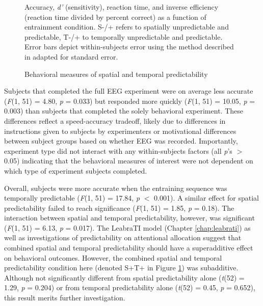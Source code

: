 \documentclass[dwyatte_dissertation.tex]{subfiles}
\begin{document}
\begin{figure}[h!]
\begin{center}
\begin{tabular}{ll}
\end{tabular}
\end{center}
\caption{Behavioral measures of spatial and temporal predictability}{Accuracy, \textit{d'} (sensitivity), reaction time, and inverse efficiency (reaction time divided by percent correct) as a function of entrainment condition. S-/+ refers to spatially unpredictable and predictable, T-/+ to temporally unpredictable and predictable. Error bars depict within-subjects error using the method described in \protect{} adapted for standard error.}
\label{fig:pleast_behave}
\end{figure}

Subjects that completed the full EEG experiment were on average less accurate (\textit{F}(1, 51) = 4.80, \textit{p} = 0.033) but responded more quickly (\textit{F}(1, 51) = 10.05, \textit{p} = 0.003) than subjects that completed the solely behavioral experiment. These differences reflect a speed-accuracy tradeoff, likely due to differences in instructions given to subjects by experimenters or motivational differences between subject groups based on whether EEG was recorded. Importantly, experiment type did not interact with any within-subjects factors (all \textit{p}'s $>$ 0.05) indicating that the behavioral measures of interest were not dependent on which type of experiment subjects completed.

Overall, subjects were more accurate when the entraining sequence was temporally predictable (\textit{F}(1, 51) = 17.84, \textit{p} $<$ 0.001). A similar effect for spatial predictability failed to reach significance (\textit{F}(1, 51) = 1.85, \textit{p} = 0.18). The interaction between spatial and temporal predictability, however, was significant (\textit{F}(1, 51) = 6.13, \textit{p} = 0.017). The LeabraTI model (Chapter \ref{chap:leabrati}) as well as investigations of predictability on attentional allocation \cite{DohertyRaoMesulamEtAl05,RohenkohlGouldPessoaEtAl14} suggest that combined spatial and temporal predictability should have a superadditive effect on behavioral outcomes. However, the combined spatial and temporal predictability condition here (denoted S+T+ in Figure \ref{fig:pleast_behave}) was subadditive. Although not significantly different from spatial predictability alone (\textit{t}(52) = 1.29, \textit{p} = 0.204) or from temporal predictability alone (\textit{t}(52) = 0.45, \textit{p} = 0.652), this result merits further investigation. 
\end{document}
